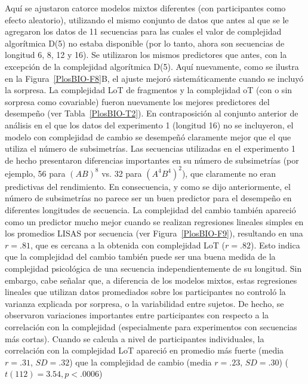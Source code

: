 Aquí se ajustaron catorce modelos mixtos diferentes (con participantes como efecto aleatorio), utilizando el mismo conjunto de datos que antes al que se le  agregaron los datos de 11 secuencias para las cuales el valor de complejidad algorítmica D(5) no estaba disponible (por lo tanto, ahora son secuencias de longitud 6, 8, 12 y 16). Se utilizaron los mismos predictores que antes, con la excepción de la complejidad algorítmica D(5). Aquí nuevamente, como se ilustra en la Figura~\ref{PlosBIO-F8}B, el ajuste mejoró sistemáticamente cuando se incluyó la sorpresa. La complejidad LoT de fragmentos y la complejidad oT (con o sin sorpresa como covariable) fueron nuevamente los mejores predictores del desempeño (ver Tabla~\ref{PlosBIO-T2}). En contraposición al conjunto anterior de análisis en el que los datos del experimento 1 (longitud 16) no se incluyeron, el modelo con complejidad de cambio se desempeñó claramente mejor que el que utiliza el número de subsimetrías. Las secuencias utilizadas en el experimento 1 de hecho presentaron diferencias importantes en su número de subsimetrías (por ejemplo, 56 para $(AB)^8$ vs. 32 para $(A^4B^4)^2$), que claramente no eran predictivas del rendimiento. En consecuencia, y como se dijo anteriormente, el número de subsimetrías no parece ser un buen predictor para el desempeño en diferentes longitudes de secuencia. La complejidad del cambio también apareció como un predictor mucho mejor cuando se realizan regresiones lineales simples en los promedios LISAS por secuencia (ver Figura~\ref{PlosBIO-F9}), resultando en una $r = .81$, que es cercana a la obtenida con complejidad LoT ($r = .82$). Esto indica que la complejidad del cambio también puede ser una buena medida de la complejidad psicológica de una secuencia independientemente de su longitud. Sin embargo, cabe señalar que, a diferencia de los modelos mixtos, estas regresiones lineales que utilizan datos promediados sobre los participantes no controló la varianza explicada por sorpresa, o la variabilidad entre sujetos. De hecho, se observaron variaciones importantes entre participantes con respecto a la correlación con la complejidad (especialmente para experimentos con secuencias más cortas). Cuando se calcula a nivel de participantes individuales, la correlación con la complejidad LoT apareció en promedio más fuerte (media $r = .31$, $SD = .32$) que la complejidad de cambio (media $r = .23$, $SD = .30$) ($t (112) = 3.54, p <.0006$)

